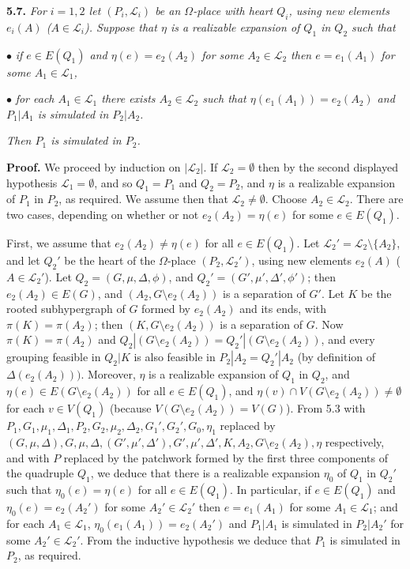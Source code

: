\textbf{5.7.} \textit{For $i = 1, 2$ let $(P_i, \mathscr{L}_i)$ be an $\Omega$-place with heart $Q_i$, using new elements $e_i(A)$ ($A \in \mathscr{L}_i$). Suppose that $\eta$ is a realizable expansion of $Q_1$ in $Q_2$ such that}

\hspace*{12pt}$\bullet$ \textit{if $e \in E(Q_1)$ and $\eta(e) = e_2(A_2)$ for some $A_2 \in \mathscr{L}_2$ then $e = e_1(A_1)$ for some $A_1 \in \mathscr{L}_1$,}

\hspace*{12pt}$\bullet$ \textit{for each $A_1 \in \mathscr{L}_1$ there exists $A_2 \in \mathscr{L}_2$ such that $\eta(e_1(A_1)) = e_2(A_2)$ and $P_1|A_1$ is simulated in $P_2|A_2$.}

\textit{Then $P_1$ is simulated in $P_2$.}

\textbf{Proof.} We proceed by induction on $|\mathscr{L}_2|$. If $\mathscr{L}_2 = \emptyset$ then by the second displayed hypothesis $\mathscr{L}_1 = \emptyset$, and so $Q_1 = P_1$ and $Q_2 = P_2$, and $\eta$ is a realizable expansion of $P_1$ in $P_2$, as required. We assume then that $\mathscr{L}_2 \ne \emptyset$. Choose $A_2 \in \mathscr{L}_2$. There are two cases, depending on whether or not $e_2(A_2) = \eta(e)$ for some $e \in E(Q_1)$.

First, we assume that $e_2(A_2) \ne \eta(e)$ for all $e \in E(Q_1)$. Let $\mathscr{L}_2' = \mathscr{L}_2 \setminus \{A_2\}$, and let $Q_2'$ be the heart of the $\Omega$-place $(P_2, \mathscr{L}_2')$, using new elements $e_2(A)$ ($A \in \mathscr{L}_2'$). Let $Q_2 = (G, \mu, \Delta, \phi)$, and $Q_2' = (G', \mu', \Delta', \phi')$; then $e_2(A_2) \in E(G)$, and $(A_2, G \setminus e_2(A_2))$ is a separation of $G'$. Let $K$ be the rooted subhypergraph of $G$ formed by $e_2(A_2)$ and its ends, with $\pi(K) = \pi(A_2)$; then $(K, G \setminus e_2(A_2))$ is a separation of $G$. Now $\pi(K) = \pi(A_2)$ and $Q_2|(G \setminus e_2(A_2)) = Q_2'|(G \setminus e_2(A_2))$, and every grouping feasible in $Q_2|K$ is also feasible in $P_2|A_2 = Q_2'|A_2$ (by definition of $\Delta(e_2(A_2)))$. Moreover, $\eta$ is a realizable expansion of $Q_1$ in $Q_2$, and $\eta(e) \in E(G \setminus e_2(A_2))$ for all $e \in E(Q_1)$, and $\eta(v) \cap V(G \setminus e_2(A_2)) \ne \emptyset$ for each $v \in V(Q_1)$ (because $V(G \setminus e_2(A_2)) = V(G)$). From 5.3 with $P_1, G_1, \mu_1, \Delta_1, P_2, G_2, \mu_2, \Delta_2, G_1', G_2', G_0, \eta_1$ replaced by $(G, \mu, \Delta), G, \mu, \Delta, (G', \mu', \Delta'), G', \mu', \Delta', K, A_2, G \setminus e_2(A_2), \eta$ respectively, and with $P$ replaced by the patchwork formed by the first three components of the quadruple $Q_1$, we deduce that there is a realizable expansion $\eta_0$ of $Q_1$ in $Q_2'$ such that $\eta_0(e) = \eta(e)$ for all $e \in E(Q_1)$. In particular, if $e \in E(Q_1)$ and $\eta_0(e) = e_2(A_2')$ for some $A_2' \in \mathscr{L}_2'$ then $e = e_1(A_1)$ for some $A_1 \in \mathscr{L}_1$; and for each $A_1 \in \mathscr{L}_1$, $\eta_0(e_1(A_1)) = e_2(A_2')$ and $P_1|A_1$ is simulated in $P_2|A_2'$ for some $A_2' \in \mathscr{L}_2'$. From the inductive hypothesis we deduce that $P_1$ is simulated in $P_2$, as required.

